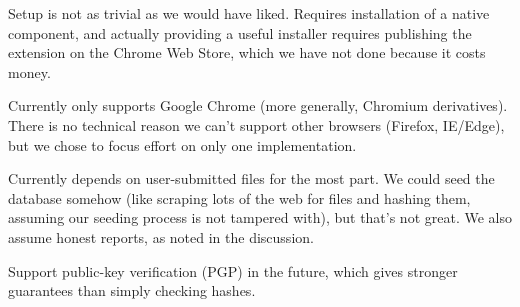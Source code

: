 \documentclass[letterpaper,twocolumn,10pt]{article}
\begin{document}
Setup is not as trivial as we would have liked. Requires installation of a native component, and actually providing a useful installer requires publishing the extension on the Chrome Web Store, which we have not done because it costs money.

Currently only supports Google Chrome (more generally, Chromium derivatives). There is no technical reason we can't support other browsers (Firefox, IE/Edge), but we chose to focus effort on only one implementation.

Currently depends on  user-submitted files for the most part. We could seed the database somehow (like scraping lots of the web for files and hashing them, assuming our seeding process is not tampered with), but that’s not great. We also assume honest reports, as noted in the discussion.

Support public-key verification (PGP) in the future, which gives stronger guarantees than simply checking hashes.

{\footnotesize 
}
\end{document}

